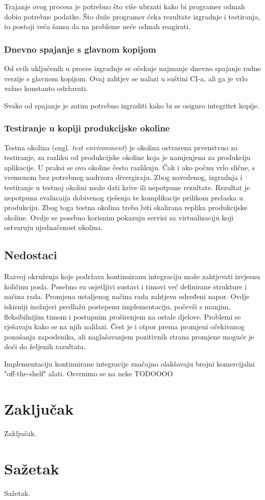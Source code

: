 \documentclass[times, utf8, seminar, numeric]{fer}
\newcommand{\eng}[1]{(engl. \textit{#1})}
\begin{document}
Trajanje ovog procesa je potrebno što više ubrzati kako bi programer odmah dobio potrebne podatke. Što duže programer ćeka rezultate izgradnje i testiranja, to postoji veća šansa da na probleme neće odmah reagirati.

\subsection{Dnevno spajanje s glavnom kopijom}
Od svih uključenih u proces izgradnje se očekuje najmanje dnevno spajanje radne verzije s glavnom kopijom. Ovaj zahtjev se nalazi u suštini CI-a, ali ga je vrlo važno konstanto održavati. 

Svako od spajanje je zatim potrebno izgraditi kako bi se osiguro integritet kopije.

\subsection{Testiranje u kopiji produkcijske okoline}
Testna okolina \eng{test environment} je okolina ostvarena prvenstvno za testiranje, za razliku od produkcijske okoline koja je namjenjena za produkciju aplikacije. U praksi se ovo okoline često razlikuju. Čak i ako počnu vrlo slične, s vremenom bez potrebnog nadrzora divergiraju. Zbog navedenog, izgradnja i testiranje u testnoj okolini može dati krive ili nepotpune rezultate. Rezultat je nepotpuna evalucaija dobivenog rješenja te komplikacije prilikom prelaska u produkciju. Zbog toga testna okolina treba biti skalirana replika produkcijske okoline. Ovdje se posebno korisnim pokazuju servisi za virtualizaciju koji ostvaruju ujednačenost okolina.

\section{Nedostaci}
Razvoj okruženja koje podržava kontinuiranu integraciju može zahtjevati izvjesnu količinu posla. Posebno su osjetljivi sustavi i timovi već definirane strukture i načina rada. Promjena ustaljenog načina rada zahtjeva određeni napor. Ovdje iskisniji inežnjeri predlažu postepenu implementaciju, počevši s manjim, fleksibilnijim timom i postupnim proširenjem na ostale djelove. Problemi se rješavaju kako se na njih nalilazi. Čest je i otpor prema promjeni očekivanog ponašanja zaposlenika, ali naglašavanjem pozitivnih strana promjene moguće je doći do željenih razultata.

Implementaciju kontinuirane integracije značajno olakšavaju brojni komercijalni "off-the-shelf" alati. Osvrnimo se na neke TODOOOO


\chapter{Zaključak}
Zaključak.




\chapter{Sažetak}
Sažetak.
\end{document}
